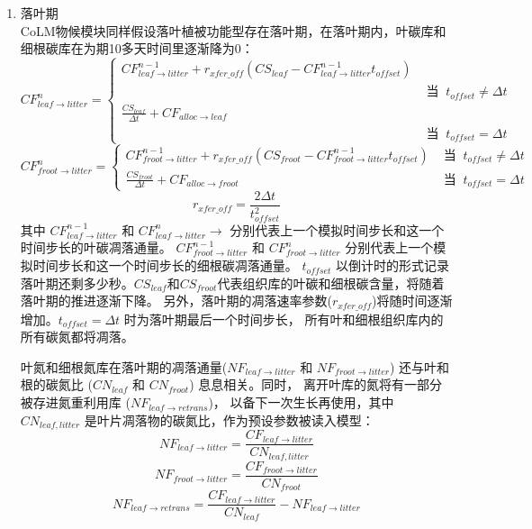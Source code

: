 \begin{enumerate}
\item 落叶期 \\
CoLM物候模块同样假设落叶植被功能型存在落叶期，在落叶期内，叶碳库和细根碳库在为期10多天时间里逐渐降为0：
\begin{equation}
CF_{ {leaf\rightarrow litter }}^{n}=\begin{cases}
CF_{ {leaf\rightarrow litter }}^{n-1}+r_{xfer\_{off}}\left(CS_{ {leaf }}-CF_{ {leaf \rightarrow litter}}^{n-1} t_{ {offset }}\right) \\ & \text{ 当 }\ t_{ {offset }} \neq \Delta t \\ 
\frac{CS_{ {leaf }}}{\Delta t}+CF_{ {alloc\rightarrow leaf }} \\ &  \text{ 当 }\ t_{offset}=\Delta t
\end{cases}
\end{equation}
\begin{equation}
CF_{ {froot }\rightarrow{ litter }}^{n}=\begin{cases}
CF_{ {froot }\rightarrow litter}^{n-1}+r_{xfer\_off}\left(CS_{ {froot }}-CF_{ {froot \rightarrow litter }}^{n-1} t_{offset}\right) &  \text{ 当 }\ t_{offset} \neq \Delta t \\ 
\frac{CS_{ {froot }}}{\Delta t}+CF_{ {alloc\rightarrow froot }} &  \text{ 当 }\ t_{offset}=\Delta t
\end{cases}
\end{equation}
\begin{equation}
r_{xfer\_off}=\frac{2 \Delta t}{t_{offset}^{2}}
\end{equation}
其中 $CF_{leaf\rightarrow litter}^{n-1}$ 和 $CF_{leaf\rightarrow litter}^n\rightarrow $ 分别代表上一个模拟时间步长和这一个时间步长的叶碳凋落通量。
$CF_{froot\rightarrow litter}^{n-1}$ 和 $CF_{froot\rightarrow litter}^n$ 分别代表上一个模拟时间步长和这一个时间步长的细根碳凋落通量。
$t_{offset}$ 以倒计时的形式记录落叶期还剩多少秒。$CS_{leaf}$和$CS_{froot}$代表组织库的叶碳和细根碳含量，将随着落叶期的推进逐渐下降。
另外，落叶期的凋落速率参数($r_{{xfer}\_{off}}$)将随时间逐渐增加。$t_{offset}=\Delta t$ 时为落叶期最后一个时间步长，
所有叶和细根组织库内的所有碳氮都将凋落。

叶氮和细根氮库在落叶期的凋落通量($NF_{leaf\rightarrow litter}$ 和 $NF_{froot\rightarrow litter}$)
还与叶和根的碳氮比 ($CN_{leaf}$ 和 $CN_{froot}$) 息息相关。同时，
离开叶库的氮将有一部分被存进氮重利用库 ($NF_{leaf\rightarrow retrans}$)，
以备下一次生长再使用，其中 $CN_{leaf,litter}$ 是叶片凋落物的碳氮比，作为预设参数被读入模型：
\begin{equation}
NF_{leaf\rightarrow litter} = \frac{CF_{leaf\rightarrow litter}}{CN_{leaf,litter}}
\end{equation}
\begin{equation}
NF_{froot\rightarrow litter} = \frac{CF_{froot\rightarrow litter}}{CN_{froot}}
\end{equation}
\begin{equation}
NF_{leaf\rightarrow retrans} = \frac{CF_{leaf\rightarrow litter}}{CN_{leaf}}-NF_{leaf\rightarrow litter}
\end{equation}


\end{enumerate}
